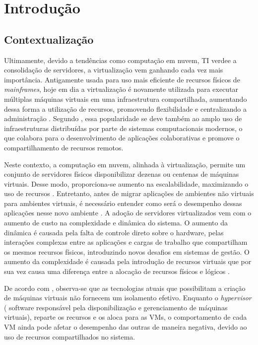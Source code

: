 \chapter{Introdução}
\section{Contextualizaç\~ao}
Ultimamente, devido a tendências como computação em nuvem, TI verde\footnotemark[1] e a consolidação de servidores, a virtualização vem ganhando cada vez mais importância. Antigamente usada para uso mais eficiente de recursos físicos de \textit{mainframes}, hoje em dia a virtualização é novamente utilizada para executar múltiplas máquinas virtuais em uma infraestrutura compartilhada, aumentando dessa forma a utilização de recursos, promovendo flexibilidade e centralizando a administração \cite{huber2011}. Segundo , essa popularidade se deve também ao amplo uso de infraestruturas distribuídas por parte de sistemas computacionais modernos, o que colabora para o desenvolvimento de aplicações colaborativas e promove o compartilhamento de recursos remotos.

Neste contexto, a computação em nuvem, alinhada à virtualização, permite um conjunto de servidores físicos disponibilizar dezenas ou centenas de máquinas virtuais. Desse modo, proporciona-se aumento na escalabilidade, maximizando o uso de recursos  \cite{popiolek2012}. Entretanto, antes de migrar aplicações de ambientes não virtuais para ambientes virtuais, é necessário entender como será o desempenho dessas aplicações nesse novo ambiente \cite{benevuto2006}. A adoção de servidores virtualizados vem com o aumento de custo na complexidade e dinâmica do sistema. O aumento da dinâmica é causada pela falta de controle direto sobre o hardware, pelas interações complexas entre as aplicações e cargas de trabalho que compartilham os mesmos recursos físicos, introduzindo novos desafios em sistemas de gestão. O aumento da complexidade é causada pela introdução de recursos virtuais que por sua vez causa uma diferença entre a alocação de recursos físicos e lógicos \cite{huber2011}.

De acordo com , observa-se que as tecnologias atuais que possibilitam a criação de máquinas virtuais não fornecem um isolamento efetivo. Enquanto o \textit{hypervisor} ( software responsável pela disponibilização e gerenciamento de máquinas virtuais), reparte os recursos e os aloca para as VMs, o comportamento de cada VM ainda pode afetar o desempenho das outras de maneira negativa, devido ao uso de recursos compartilhados no sistema.  

